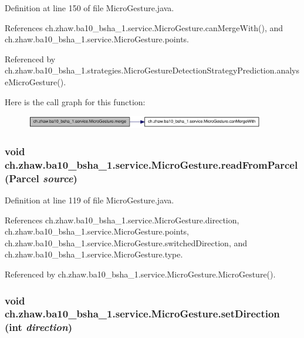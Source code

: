 Definition at line 150 of file MicroGesture.java.

References ch.zhaw.ba10\_\-bsha\_\-1.service.MicroGesture.canMergeWith(), and ch.zhaw.ba10\_\-bsha\_\-1.service.MicroGesture.points.

Referenced by ch.zhaw.ba10\_\-bsha\_\-1.strategies.MicroGestureDetectionStrategyPrediction.analyseMicroGesture().

Here is the call graph for this function:\nopagebreak
\begin{figure}[H]
\begin{center}
\leavevmode
\includegraphics[width=297pt]{classch_1_1zhaw_1_1ba10__bsha__1_1_1service_1_1MicroGesture_a363ee314636824c156497dd7138edaa9_cgraph}
\end{center}
\end{figure}
\hypertarget{classch_1_1zhaw_1_1ba10__bsha__1_1_1service_1_1MicroGesture_ad3f092e31d34245e598866b7e11e8d42}{
\subsubsection[{readFromParcel}]{\setlength{\rightskip}{0pt plus 5cm}void ch.zhaw.ba10\_\-bsha\_\-1.service.MicroGesture.readFromParcel (Parcel {\em source})}}
\label{classch_1_1zhaw_1_1ba10__bsha__1_1_1service_1_1MicroGesture_ad3f092e31d34245e598866b7e11e8d42}


Definition at line 119 of file MicroGesture.java.

References ch.zhaw.ba10\_\-bsha\_\-1.service.MicroGesture.direction, ch.zhaw.ba10\_\-bsha\_\-1.service.MicroGesture.points, ch.zhaw.ba10\_\-bsha\_\-1.service.MicroGesture.switchedDirection, and ch.zhaw.ba10\_\-bsha\_\-1.service.MicroGesture.type.

Referenced by ch.zhaw.ba10\_\-bsha\_\-1.service.MicroGesture.MicroGesture().\hypertarget{classch_1_1zhaw_1_1ba10__bsha__1_1_1service_1_1MicroGesture_a2bf5f83579721d1ccfc5f36b39eb9ea9}{
\subsubsection[{setDirection}]{\setlength{\rightskip}{0pt plus 5cm}void ch.zhaw.ba10\_\-bsha\_\-1.service.MicroGesture.setDirection (int {\em direction})}}
\label{classch_1_1zhaw_1_1ba10__bsha__1_1_1service_1_1MicroGesture_a2bf5f83579721d1ccfc5f36b39eb9ea9}


